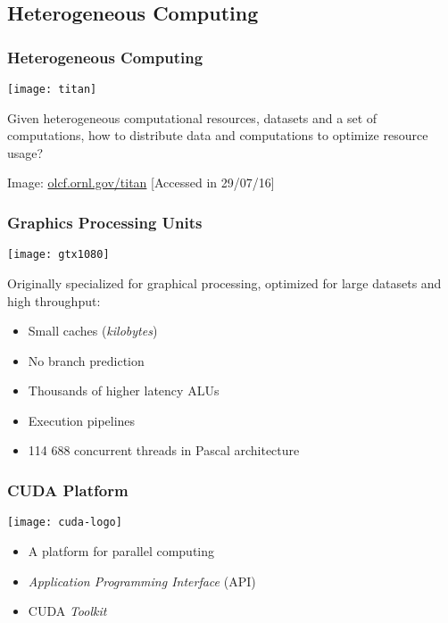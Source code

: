 \documentclass[10pt, compress]{beamer}
\begin{document}
\subsection{Heterogeneous Computing}

\begin{frame}
    \frametitle{Heterogeneous Computing}
    \begin{center}
        \texttt{[image: titan]}
    \end{center}

    Given \alert{heterogeneous} computational resources, \alert{datasets}
    and a set of \alert{computations}, how to distribute data and computations
    to \alert{optimize resource usage}?
    \hfill

    \begin{center}
    \tiny{Image: \url{olcf.ornl.gov/titan} [Accessed in 29/07/16]}
    \end{center}
\end{frame}

\begin{frame}
    \frametitle{Graphics Processing Units}
    \begin{center}
        \texttt{[image: gtx1080]}
    \end{center}
    \pause

    Originally specialized for \alert{graphical processing},
    optimized for large datasets and \alert{high throughput}:

    \begin{itemize}
        \item Small caches (\textit{kilobytes})
        \item No \alert{branch prediction}
        \item Thousands of \alert{higher latency} ALUs
        \item Execution \alert{pipelines}
        \item 114 688 concurrent \alert{threads} in Pascal architecture
    \end{itemize}
\end{frame}

\begin{frame}
    \frametitle{CUDA Platform}
    \begin{center}
        \texttt{[image: cuda-logo]}
    \end{center}

    \begin{itemize}
        \item A platform for \alert{parallel computing}
        \item \textit{Application Programming Interface} (API)
        \item CUDA \textit{Toolkit}
    \end{itemize}
\end{frame}
\end{document}
